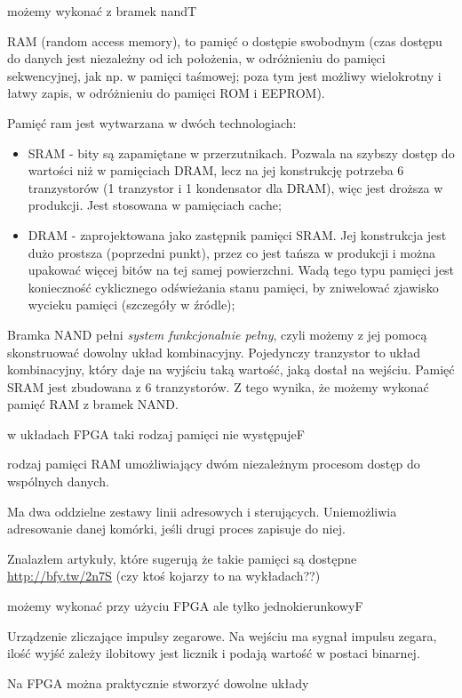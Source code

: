 {możemy wykonać z bramek nand}{T}
{
RAM (random access memory), to pamięć o dostępie swobodnym (czas dostępu do danych jest niezależny od ich położenia, w odróżnieniu do pamięci sekwencyjnej, jak np. w pamięci taśmowej; poza tym jest możliwy wielokrotny i łatwy zapis, w odróżnieniu do pamięci ROM i EEPROM).

Pamięć ram jest wytwarzana w dwóch technologiach:
\begin{itemize}
\item SRAM - \cite{sram} bity są zapamiętane w przerzutnikach. Pozwala na szybszy dostęp do wartości niż w pamięciach DRAM, lecz na jej konstrukcję potrzeba 6 tranzystorów (1 tranzystor i 1 kondensator dla DRAM), więc jest droższa w produkcji. Jest stosowana w pamięciach cache;
\item DRAM - \cite{dram} zaprojektowana jako zastępnik pamięci SRAM. Jej konstrukcja jest dużo prostsza (poprzedni punkt), przez co jest tańsza w produkcji i można upakować więcej bitów na tej samej powierzchni. Wadą tego typu pamięci jest konieczność cyklicznego odświeżania stanu pamięci, by zniwelować zjawisko wycieku pamięci (szczegóły w źródle);
\end{itemize}

}
{
Bramka NAND pełni \emph{system funkcjonalnie pełny}, czyli możemy z jej pomocą skonstruować dowolny układ kombinacyjny. Pojedynczy tranzystor to układ kombinacyjny, który daje na wyjściu taką wartość, jaką dostał na wejściu.
Pamięć SRAM jest zbudowana z 6 tranzystorów.
Z tego wynika, że możemy wykonać pamięć RAM z bramek NAND.
}
\label{odp:92}

{w układach FPGA taki rodzaj pamięci nie występuje}{F}
{
\cite{dwuport} rodzaj pamięci RAM umożliwiający dwóm niezależnym procesom dostęp do wspólnych danych.

Ma dwa oddzielne zestawy linii adresowych i sterujących. Uniemożliwia adresowanie danej komórki, jeśli drugi proces zapisuje do niej.

}
{Znalazłem artykuły, które sugerują że takie pamięci są dostępne \url{http://bfy.tw/2n7S} (czy ktoś kojarzy to na wykładach??)}

{możemy wykonać przy użyciu FPGA ale tylko jednokierunkowy}{F}
{
\cite{licz} Urządzenie zliczające impulsy zegarowe. Na wejściu ma sygnał impulsu zegara, ilość wyjść zależy ilobitowy jest licznik i podają wartość w postaci binarnej.

}
{Na FPGA można praktycznie stworzyć dowolne układy}

